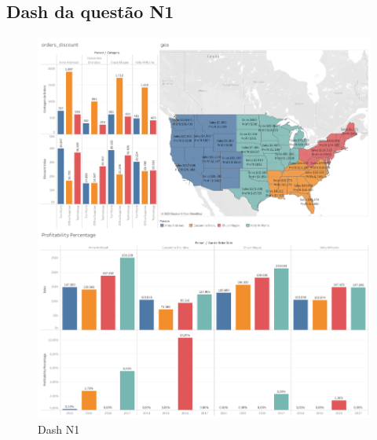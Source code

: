 \subsection*{Dash da questão N1}
\begin{figure}[h]
	\centering
	\includegraphics[width=\textwidth,keepaspectratio]{figures/n1_dash}
	\caption{Dash N1}
	\label{lof}
\end{figure}